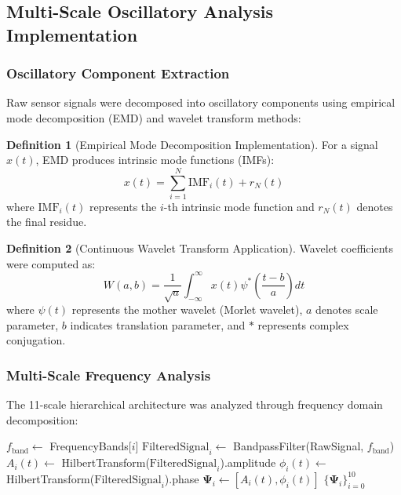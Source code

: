 \documentclass[12pt,a4paper]{article}
\theoremstyle{definition}
\newtheorem{definition}{Definition}[section]
\begin{document}
\subsection{Multi-Scale Oscillatory Analysis Implementation}

\subsubsection{Oscillatory Component Extraction}

Raw sensor signals were decomposed into oscillatory components using empirical mode decomposition (EMD) and wavelet transform methods:

\begin{definition}[Empirical Mode Decomposition Implementation]
For a signal $x(t)$, EMD produces intrinsic mode functions (IMFs):
\begin{equation}
x(t) = \sum_{i=1}^{N} \text{IMF}_i(t) + r_N(t)
\end{equation}
where $\text{IMF}_i(t)$ represents the $i$-th intrinsic mode function and $r_N(t)$ denotes the final residue.
\end{definition}

\begin{definition}[Continuous Wavelet Transform Application]
Wavelet coefficients were computed as:
\begin{equation}
W(a,b) = \frac{1}{\sqrt{a}} \int_{-\infty}^{\infty} x(t) \psi^*\left(\frac{t-b}{a}\right) dt
\end{equation}
where $\psi(t)$ represents the mother wavelet (Morlet wavelet), $a$ denotes scale parameter, $b$ indicates translation parameter, and $*$ represents complex conjugation.
\end{definition}

\subsubsection{Multi-Scale Frequency Analysis}

The 11-scale hierarchical architecture was analyzed through frequency domain decomposition:

\begin{algorithm}
\caption{Multi-Scale Frequency Decomposition}
\begin{algorithmic}
        \State $f_{\text{band}} \leftarrow$ FrequencyBands[$i$]
        \State $\text{FilteredSignal}_i \leftarrow$ BandpassFilter(RawSignal, $f_{\text{band}}$)
        \State $A_i(t) \leftarrow$ HilbertTransform($\text{FilteredSignal}_i$).amplitude
        \State $\phi_i(t) \leftarrow$ HilbertTransform($\text{FilteredSignal}_i$).phase
        \State $\mathbf{\Psi}_i \leftarrow [A_i(t), \phi_i(t)]$
    \EndFor
    \State \Return $\{\mathbf{\Psi}_i\}_{i=0}^{10}$
\EndProcedure
\end{algorithmic}
\end{algorithm}
\end{document}
